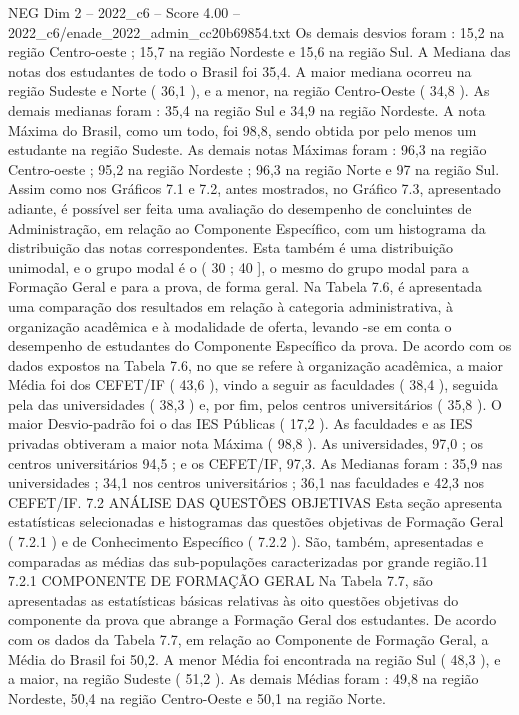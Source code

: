 \begin{textsample}{NEG Dim 2 – 2022\_c6 – Score 4.00 – 2022\_c6/enade\_2022\_admin\_cc20b69854.txt}
Os demais desvios foram : 15,2 na região Centro-oeste ; 15,7 na região Nordeste e 15,6 na região Sul.
A Mediana das notas dos estudantes de todo o Brasil foi 35,4.
A maior mediana ocorreu na região Sudeste e Norte ( 36,1 ), e a menor, na região Centro-Oeste ( 34,8 ).
As demais medianas foram : 35,4 na região Sul e 34,9 na região Nordeste.
A nota Máxima do Brasil, como um todo, foi 98,8, sendo obtida por pelo menos um estudante na região Sudeste.
As demais notas Máximas foram : 96,3 na região Centro-oeste ; 95,2 na região Nordeste ; 96,3 na região Norte e 97 na região Sul.
Assim como nos Gráficos 7.1 e 7.2, antes mostrados, no Gráfico 7.3, apresentado adiante, é possível ser feita uma avaliação do desempenho de concluintes de Administração, em relação ao Componente Específico, com um histograma da distribuição das notas correspondentes.
Esta também é uma distribuição unimodal, e o grupo modal é o ( 30 ; 40 ], o mesmo do grupo modal para a Formação Geral e para a prova, de forma geral.
Na Tabela 7.6, é apresentada uma comparação dos resultados em relação à categoria administrativa, à organização acadêmica e à modalidade de oferta, levando -se em conta o desempenho de estudantes do Componente Específico da prova.
De acordo com os dados expostos na Tabela 7.6, no que se refere à organização acadêmica, a maior Média foi dos CEFET/IF ( 43,6 ), vindo a seguir as faculdades ( 38,4 ), seguida pela das universidades ( 38,3 ) e, por fim, pelos centros universitários ( 35,8 ).
O maior Desvio-padrão foi o das IES Públicas ( 17,2 ).
As faculdades e as IES privadas obtiveram a maior nota Máxima ( 98,8 ).
As universidades, 97,0 ; os centros universitários 94,5 ; e os CEFET/IF, 97,3.
As Medianas foram : 35,9 nas universidades ; 34,1 nos centros universitários ; 36,1 nas faculdades e 42,3 nos CEFET/IF. 7.2 ANÁLISE DAS QUESTÕES OBJETIVAS Esta seção apresenta estatísticas selecionadas e histogramas das questões objetivas de Formação Geral ( 7.2.1 ) e de Conhecimento Específico ( 7.2.2 ).
São, também, apresentadas e comparadas as médias das sub-populações caracterizadas por grande região.11 7.2.1 COMPONENTE DE FORMAÇÃO GERAL Na Tabela 7.7, são apresentadas as estatísticas básicas relativas às oito questões objetivas do componente da prova que abrange a Formação Geral dos estudantes.
De acordo com os dados da Tabela 7.7, em relação ao Componente de Formação Geral, a Média do Brasil foi 50,2.
A menor Média foi encontrada na região Sul ( 48,3 ), e a maior, na região Sudeste ( 51,2 ).
As demais Médias foram : 49,8 na região Nordeste, 50,4 na região Centro-Oeste e 50,1 na região Norte.

\end{textsample}
